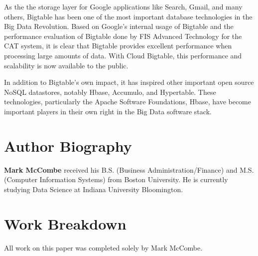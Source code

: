 \documentclass[9pt,twocolumn,twoside]{../../styles/osajnl}
\begin{document}
As the the storage layer for Google applications like Search, Gmail, and many others, Bigtable has been one of the most important database technologies in the Big Data Revolution. Based on Google's internal usage of Bigtable and the performance evaluation of Bigtable done by FIS Advanced Technology for the CAT system, it is clear that Bigtable provides excellent performance when processing large amounts of data. With Cloud Bigtable, this performance and scalability is now available to the public.  

In addition to Bigtable's own impact, it has inspired other important open source NoSQL datastores, notably Hbase, Accumulo, and Hypertable.  These technologies, particularly the Apache Software Foundations, Hbase, have become important players in their own right in the Big Data software stack. 



 
\section*{Author Biography}
\begingroup
\setlength\intextsep{0pt}
\begin{minipage}[t][3.2cm][t]{1.0\columnwidth} %
  \noindent
  {\bfseries Mark McCombe} received his B.S. (Business Administration/Finance) and M.S. (Computer Information Systems) from Boston University.  He is currently studying Data Science at Indiana University Bloomington.
\end{minipage}
\endgroup

\newpage

\appendix

\section{Work Breakdown}

All work on this paper was completed solely by Mark McCombe.
\end{document}
